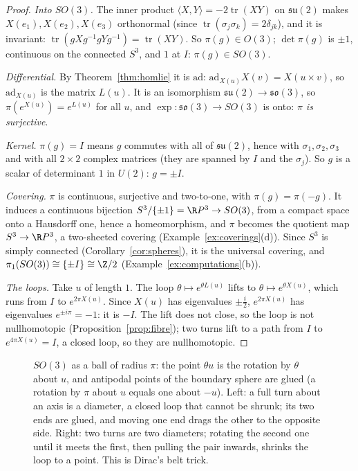 \begin{proof}
\emph{Into $SO(3)$.} The inner product $\langle X,Y\rangle=-2\operatorname{tr}(XY)$ on $\mathfrak{su}(2)$ makes $X(e_1),X(e_2),X(e_3)$ orthonormal (since $\operatorname{tr}(\sigma_j\sigma_k)=2\delta_{jk}$), and it is invariant:
$\operatorname{tr}(gXg^{-1}gYg^{-1})=\operatorname{tr}(XY)$. So $\pi(g)\in O(3)$; $\det\pi(g)$ is $\pm1$, continuous on the connected $S^3$, and $1$ at $I$: $\pi(g)\in SO(3)$.

\emph{Differential.} By Theorem~\ref{thm:homlie} it is $\mathrm{ad}$: $\mathrm{ad}_{X(u)}X(v)=X(u\times v)$, so $\mathrm{ad}_{X(u)}$ is the matrix $L(u)$. It is an isomorphism $\mathfrak{su}(2)\to\mathfrak{so}(3)$, so
$\pi(e^{X(u)})=e^{L(u)}$ for all $u$, and $\exp\colon\mathfrak{so}(3)\to SO(3)$ is onto: \emph{$\pi$ is surjective}.

\emph{Kernel.} $\pi(g)=I$ means $g$ commutes with all of $\mathfrak{su}(2)$, hence with $\sigma_1,\sigma_2,\sigma_3$ and with all $2\times2$ complex matrices (they are spanned by $I$ and the $\sigma_j$). So $g$ is a scalar of
determinant $1$ in $U(2)$: $g=\pm I$.

\emph{Covering.} $\pi$ is continuous, surjective and two-to-one, with $\pi(g)=\pi(-g)$. It induces a continuous bijection $S^3/\{\pm1\}=\R P^3\to SO(3)$, from a compact space onto a Hausdorff one, hence a
homeomorphism, and $\pi$ becomes the quotient map $S^3\to\R P^3$, a two-sheeted covering (Example~\ref{ex:coverings}(d)). Since $S^3$ is simply connected (Corollary~\ref{cor:spheres}), it is the universal covering,
and $\pi_1(SO(3))\cong\{\pm I\}\cong\Z/2$ (Example~\ref{ex:computations}(b)).

\emph{The loops.} Take $u$ of length $1$. The loop $\theta\mapsto e^{\theta L(u)}$ lifts to $\theta\mapsto e^{\theta X(u)}$, which runs from $I$ to $e^{2\pi X(u)}$. Since $X(u)$ has eigenvalues $\pm\frac i2$, $e^{2\pi X(u)}$ has
eigenvalues $e^{\pm i\pi}=-1$: it is $-I$. The lift does not close, so the loop is not nullhomotopic (Proposition~\ref{prop:fibre}); two turns lift to a path from $I$ to $e^{4\pi X(u)}=I$, a closed loop, so
they are nullhomotopic.
\end{proof}

\begin{figure}[ht]
\centering
{}
\caption{$SO(3)$ as a ball of radius $\pi$: the point $\theta u$ is the rotation by $\theta$ about $u$, and antipodal points of the boundary sphere are glued (a rotation by $\pi$ about $u$ equals one about
$-u$). Left: a full turn about an axis is a diameter, a closed loop that cannot be shrunk; its two ends are glued, and moving one end drags the other to the opposite side. Right: two turns are two
diameters; rotating the second one until it meets the first, then pulling the pair inwards, shrinks the loop to a point. This is Dirac's belt trick.}
\label{fig:ballmodel}
\end{figure}

